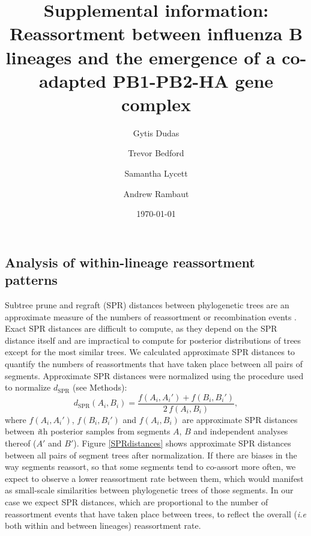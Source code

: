 \documentclass[11pt,oneside,letterpaper]{article}
\newcommand{\dspr}{d_\mathrm{SPR}}
\begin{document}
\title{\vspace{1.0cm} \huge \bf Supplemental information:\\ \LARGE Reassortment between influenza B lineages and the emergence of a co-adapted PB1-PB2-HA gene complex}

\author[1]{Gytis Dudas}
\author[2]{Trevor Bedford}
\author[1,3]{Samantha Lycett}
\author[1,4,5]{Andrew Rambaut}


\date{\today}

\maketitle

\setcounter{figure}{0}
\setcounter{table}{0}
\renewcommand{\thefigure}{S\arabic{figure}}
\renewcommand{\thetable}{S\arabic{table}}

\subsection*{Analysis of within-lineage reassortment patterns}
Subtree prune and regraft (SPR) distances between phylogenetic trees are an approximate measure of the numbers of reassortment or recombination events \citep{svinti2013}.
Exact SPR distances are difficult to compute, as they depend on the SPR distance itself and are impractical to compute for posterior distributions of trees except for the most similar trees.
We calculated approximate SPR distances \citep{whidden2009,whidden2010,whidden2013} to quantify the numbers of reassortments that have taken place between all pairs of segments.
Approximate SPR distances were normalized using the procedure used to normalize $\dspr$ (see Methods):
\begin{equation}
\dspr(A_i, B_i) = \frac{f(A_i, A_i') + f(B_i, B_i')}{2 \, f(A_i, B_i)},
\end{equation}
where $f(A_i, A_i')$, $f(B_i, B_i')$ and $f(A_i, B_i)$ are approximate SPR distances between \textit{i}th posterior samples from segments $A$, $B$ and independent analyses thereof ($A'$ and $B'$).
Figure \ref{SPRdistances} shows approximate SPR distances between all pairs of segment trees after normalization.
If there are biases in the way segments reassort, so that some segments tend to co-assort more often, we expect to observe a lower reassortment rate between them, which would manifest as small-scale similarities between phylogenetic trees of those segments.
In our case we expect SPR distances, which are proportional to the number of reassortment events that have taken place between trees, to reflect the overall (\textit{i.e} both within and between lineages) reassortment rate.
\end{document}
